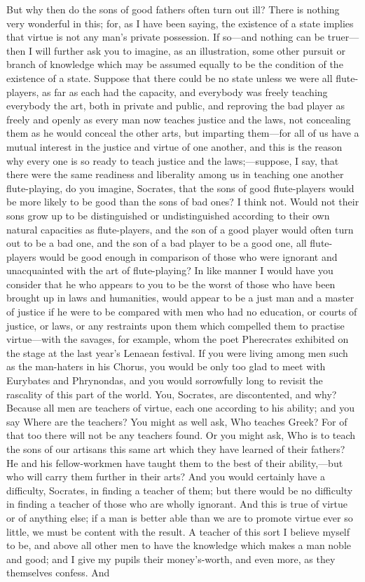 \documentclass[11pt,letter]{article}
\begin{document}
\par  But why then do the sons of good fathers often turn out ill? There is nothing very wonderful in this; for, as I have been saying, the existence of a state implies that virtue is not any man's private possession. If so—and nothing can be truer—then I will further ask you to imagine, as an illustration, some other pursuit or branch of knowledge which may be assumed equally to be the condition of the existence of a state. Suppose that there could be no state unless we were all flute-players, as far as each had the capacity, and everybody was freely teaching everybody the art, both in private and public, and reproving the bad player as freely and openly as every man now teaches justice and the laws, not concealing them as he would conceal the other arts, but imparting them—for all of us have a mutual interest in the justice and virtue of one another, and this is the reason why every one is so ready to teach justice and the laws;—suppose, I say, that there were the same readiness and liberality among us in teaching one another flute-playing, do you imagine, Socrates, that the sons of good flute-players would be more likely to be good than the sons of bad ones? I think not. Would not their sons grow up to be distinguished or undistinguished according to their own natural capacities as flute-players, and the son of a good player would often turn out to be a bad one, and the son of a bad player to be a good one, all flute-players would be good enough in comparison of those who were ignorant and unacquainted with the art of flute-playing? In like manner I would have you consider that he who appears to you to be the worst of those who have been brought up in laws and humanities, would appear to be a just man and a master of justice if he were to be compared with men who had no education, or courts of justice, or laws, or any restraints upon them which compelled them to practise virtue—with the savages, for example, whom the poet Pherecrates exhibited on the stage at the last year's Lenaean festival. If you were living among men such as the man-haters in his Chorus, you would be only too glad to meet with Eurybates and Phrynondas, and you would sorrowfully long to revisit the rascality of this part of the world. You, Socrates, are discontented, and why? Because all men are teachers of virtue, each one according to his ability; and you say Where are the teachers? You might as well ask, Who teaches Greek? For of that too there will not be any teachers found. Or you might ask, Who is to teach the sons of our artisans this same art which they have learned of their fathers? He and his fellow-workmen have taught them to the best of their ability,—but who will carry them further in their arts? And you would certainly have a difficulty, Socrates, in finding a teacher of them; but there would be no difficulty in finding a teacher of those who are wholly ignorant. And this is true of virtue or of anything else; if a man is better able than we are to promote virtue ever so little, we must be content with the result. A teacher of this sort I believe myself to be, and above all other men to have the knowledge which makes a man noble and good; and I give my pupils their money's-worth, and even more, as they themselves confess. And 
\end{document}
